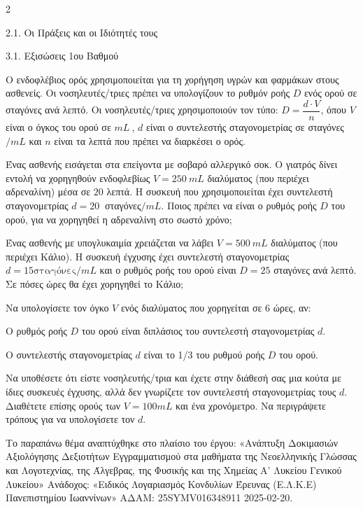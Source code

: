 \begin{ylh}{2}
    \item 2.1. Οι Πράξεις και οι Ιδιότητές τους
    \item 3.1. Εξισώσεις 1ου Βαθμού
\end{ylh}
Ο ενδοφλέβιος ορός χρησιμοποιείται για τη χορήγηση υγρών και φαρμάκων στους ασθενείς. Οι νοσηλευτές/τριες πρέπει να υπολογίζουν το ρυθμόν ροής $D$ ενός ορού σε σταγόνες ανά λεπτό. Οι νοσηλευτές/τριες χρησιμοποιούν τον τύπο:
$D = \dfrac{d \cdot V}{n}$, όπου
$V$ είναι ο όγκος του ορού σε $mL\ $,
$d$ είναι ο συντελεστής σταγονομετρίας σε σταγόνες$/mL$ και
$n$ είναι τα λεπτά που πρέπει να διαρκέσει ο ορός.
\begin{alist}
\item

\begin{rlist}
\item Ένας ασθενής εισάγεται στα επείγοντα με σοβαρό αλλεργικό σοκ. Ο γιατρός δίνει εντολή να χορηγηθούν ενδοφλεβίως $V = 250\ mL$ διαλύματος (που περιέχει αδρεναλίνη) μέσα σε $20$ λεπτά. Η συσκευή που χρησιμοποιείται έχει συντελεστή σταγονομετρίας $d = 20\ $ σταγόνες$/mL$. Ποιος πρέπει να είναι ο ρυθμός ροής $D$ του ορού, για να χορηγηθεί η αδρεναλίνη στο σωστό χρόνο;

\item Ένας ασθενής με υπογλυκαιμία χρειάζεται να λάβει $V = 500\ mL$ διαλύματος (που περιέχει Κάλιο). Η συσκευή έγχυσης έχει συντελεστή σταγονομετρίας $d = 15\text{σταγόνες}/mL$ και ο ρυθμός ροής του ορού είναι $D = 25$ σταγόνες ανά λεπτό. Σε πόσες ώρες θα έχει χορηγηθεί το Κάλιο;
\end{rlist}
\item Να υπολογίσετε τον όγκο $V$ ενός διαλύματος που χορηγείται σε $6$ ώρες, αν:

\begin{rlist}
\item Ο ρυθμός ροής $D$ του ορού είναι διπλάσιος του συντελεστή σταγονομετρίας $d$.

\item Ο συντελεστής σταγονομετρίας $d$ είναι το 1/3 του ρυθμού ροής $D$ του ορού.

\end{rlist}
\item Να υποθέσετε ότι είστε νοσηλευτής/τρια και έχετε στην διάθεσή σας μια κούτα με ίδιες συσκευές έγχυσης, αλλά δεν γνωρίζετε τον συντελεστή σταγονομετρίας τους $d$. Διαθέτετε επίσης ορούς των $V = 100mL$ και ένα χρονόμετρο. Να περιγράψετε τρόπους για να υπολογίσετε τον $d$.

{\footnotesize Το παραπάνω θέμα αναπτύχθηκε στο πλαίσιο του έργου: «Ανάπτυξη Δοκιμασιών Αξιολόγησης Δεξιοτήτων Εγγραμματισμού στα μαθήματα της Νεοελληνικής Γλώσσας και Λογοτεχνίας, της Άλγεβρας, της Φυσικής και της Χημείας Α' Λυκείου Γενικού Λυκείου» Ανάδοχος: «Ειδικός Λογαριασμός Κονδυλίων Έρευνας (Ε.Λ.Κ.Ε) Πανεπιστημίου Ιωαννίνων» ΑΔΑΜ: 25SYMV016348911 2025-02-20.}
\end{alist}

